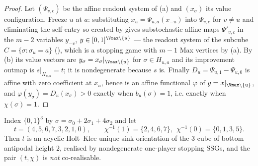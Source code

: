 \begin{proof}
Let $(\Psi_{v,c})$ be the affine readout system of (a)
and $(x_\sigma)$ its value configuration. Freeze $u$ at $a$: substituting
$x_u=\Psi_{u,a}(x_{-u})$ into $\Psi_{v,c}$ for $v\ne u$ and eliminating the
self-entry so created by  gives substochastic affine
maps $\Psi'_{v,c}$ in the $m-2$ variables $y_{-v}$, $y\in[0,1]^{\Vmax\setminus\{u\}}$
--- the readout system of the subcube $C=\{\sigma:\sigma_u=a\}$
(), which is a stopping game with $m-1$ Max vertices by
(a). By (b) its value vectors are
$y_\sigma=x_\sigma|_{\Vmax\setminus\{u\}}$ for $\sigma\in H_{u,a}$ and its
improvement outmap is $s|_{H_{u,a}}=t$; it is nondegenerate because $s$ is.
Finally $D_u=\Psi_{u,1}-\Psi_{u,0}$ is affine with zero coefficient at $x_u$,
hence is an affine functional $\varphi$ of $y=x|_{\Vmax\setminus\{u\}}$, and
$\varphi(y_\sigma)=D_u(x_\sigma)>0$ exactly when $b_u(\sigma)=1$, i.e. exactly
when $\chi(\sigma)=1$.
\end{proof}

\begin{theorem}\label{hkc:obstruction}
Index $\{0,1\}^{3}$ by $\sigma=\sigma_0+2\sigma_1+4\sigma_2$ and let
\[
  t=(4,5,6,7,3,2,1,0),\qquad \chi^{-1}(1)=\{2,4,6,7\},\ \ \chi^{-1}(0)=\{0,1,3,5\}.
\]
Then $t$ is an acyclic Holt--Klee unique sink orientation of the $3$-cube of
bottom-antipodal height $2$, realised by nondegenerate one-player stopping
SSGs, and the pair $(t,\chi)$ is \emph{not} co-realisable.
\end{theorem}

